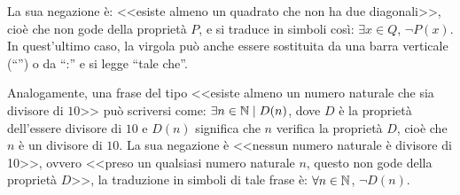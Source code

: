La sua negazione è: <<esiste almeno un quadrato che non ha due diagonali>>, cioè che non gode della proprietà $P$, e si traduce in simboli così: $\exists x\in Q$, $\neg P(x)$.
In quest'ultimo caso, la virgola può anche essere sostituita da una barra verticale (``\textbar'') o da ``:'' e si legge ``tale che''.

Analogamente, una frase del tipo <<esiste almeno un numero naturale che sia divisore di $10$>> può scriversi come: $\exists n\in\mathbb{N}\mid D(n)$, dove $D$ è la proprietà dell'essere divisore di $10$ e $D(n)$ significa che $n$ verifica la proprietà $D$, cioè che $n$ è un divisore di $10$. La sua negazione è <<nessun numero naturale è divisore di 10>>, ovvero <<preso un qualsiasi numero naturale $n$, questo non gode della proprietà $D$>>, la traduzione in simboli di tale frase è: $\forall n\in\mathbb{N}$, ${\neg}D(n)$.

